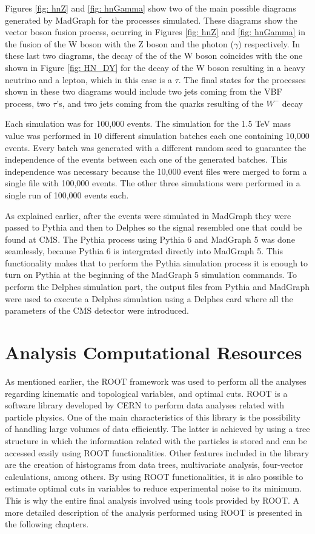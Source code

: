 Figures \ref{fig: hnZ} and \ref{fig: hnGamma} show two of the main possible diagrams generated by MadGraph for the processes simulated. These diagrams show the vector boson fusion process, ocurring in Figures \ref{fig: hnZ} and \ref{fig: hnGamma} in the fusion of the W boson with the Z boson and the photon ($\gamma$) respectively. In these last two diagrams, the decay of the of the W boson coincides with the one shown in Figure \ref{fig: HN_DY} for the decay of the W boson resulting in a heavy neutrino and a lepton, which in this case is a $\tau$. The final states for the processes shown in these two diagrams would include two jets coming from the VBF process, two $\tau$'s, and two jets coming from the quarks resulting of the $W^{-}$ decay

Each simulation was for 100,000 events. The simulation for the 1.5 TeV mass value was performed in 10 different simulation batches each one containing 10,000 events. Every batch was generated with a different random seed to guarantee the independence of the events between each one of the generated batches. This independence was necessary because the 10,000 event files were merged to form a single file with 100,000 events. The other three simulations were performed in a single run of 100,000 events each.

As explained earlier, after the events were simulated in MadGraph they were passed to Pythia and then to Delphes so the signal resembled one that could be found at CMS. The Pythia process using Pythia 6 and MadGraph 5 was done seamlessly, because Pythia 6 is intergrated directly into MadGraph 5. This functionality makes that to perform the Pythia simulation process it is enough to turn on Pythia at the beginning of the MadGraph 5 simulation commands. To perform the Delphes simulation part, the output files from Pythia and MadGraph were used to execute a Delphes simulation using a Delphes card where all the parameters of the CMS detector were introduced.

\section{Analysis Computational Resources}

As mentioned earlier, the ROOT framework was used to perform all the analyses regarding kinematic and topological variables, and optimal cuts. ROOT is a software library developed by CERN to perform data analyses related with particle physics. One of the main characteristics of this library is the possibility of handling large volumes of data efficiently. The latter is achieved by using a tree structure in which the information related with the particles is stored and can be accessed easily using ROOT functionalities. Other features included in the library are the creation of histograms from data trees, multivariate analysis, four-vector calculations, among others. By using ROOT functionalities, it is also possible to estimate optimal cuts in variables to reduce experimental noise to its minimum. This is why the entire final analysis involved using tools provided by ROOT. A more detailed description of the analysis performed using ROOT is presented in the following chapters.

